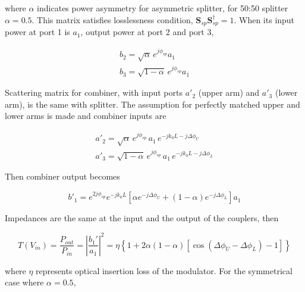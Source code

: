 \documentclass[thesis]{deutez}
\begin{document}
    where $\alpha$ indicates power asymmetry for asymmetric splitter, for 50:50 splitter $\alpha=0.5$. This matrix satisfies losslessness condition, $\bm S_{sp}\bm S^\dagger_{sp} =1$. When its input power at port 1 is \textit{$a_1$}, output power at port 2 and port 3, 

    \begin{subequations}\label{eq:MZM-splitter-s-matrix}
        \begin{align}
             b_2 = \sqrt{\alpha}\,e^{j\phi_{sp}} a_1 \label{eq:MZM-splitter-s-matrix-b2} \\
             b_3 = \sqrt{1-\alpha}\,e^{j\phi_{sp}} a_1\label{eq:MZM-splitter-s-matrix-b3}
        \end{align}
    \end{subequations}
    
    Scattering matrix for combiner, with input ports \textit{$a'_2$} (upper arm) and \textit{$a'_3$} (lower arm), is the same with splitter. The assumption for perfectly matched upper and lower arms is made and combiner inputs are

    \begin{subequations}\label{eq:MZM-combiner-s-matrix}
        \begin{align}
             a'_2 = \sqrt{\alpha}\,e^{j\phi_{sp}} \,a_1\,e^{-jk_0L-j\Delta\phi_U} \label{eq:MZM-combiner-s-matrix-a2} \\
             a'_3 = \sqrt{1-\alpha}\,e^{j\phi_{sp}} \, a_1\, e^{-jk_0L-j\Delta\phi_L} \label{eq:MZM-combiner-s-matrix-a3}
        \end{align}
    \end{subequations}
    
    Then combiner output becomes

    \begin{equation}
        b'_1 = e^{2j\phi_{sp}}e^{-jk_0L} \left[ \alpha e^{-j\Delta\phi_U} + (1-\alpha) e^{-j\Delta\phi_L} \right] a_1
    \end{equation}

    Impedances are the same at the input and the output of the couplers, then 

    \begin{equation}
        T(V_{in}) = \frac{P_{out}}{P_{in}} = \left| \frac{b_1'}{a_1} \right|^2 = \eta \left\{ 1 + 2\alpha(1 - \alpha)\left[ \cos(\Delta\phi_U - \Delta\phi_L) - 1 \right] \right\}
    \end{equation}

    where $\eta$ represents optical insertion loss of the modulator. For the symmetrical case where $\alpha=0.5$, 
\end{document}
